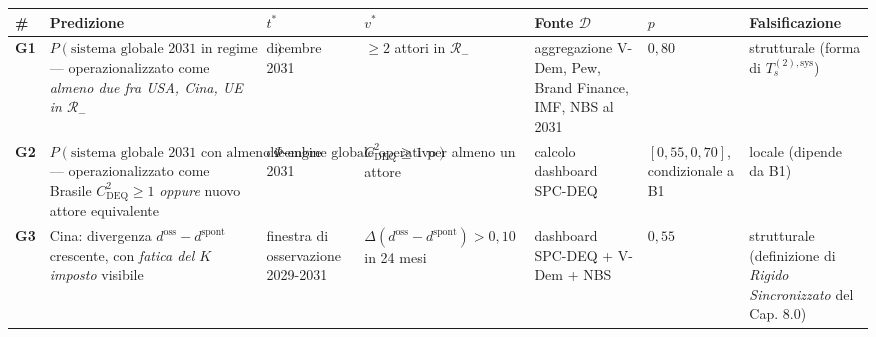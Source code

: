 {\def\LTcaptype{none} %
{\small\begin{longtable}[]{@{}
  >{\raggedright\arraybackslash}p{}
  >{\raggedright\arraybackslash}p{}
  >{\raggedright\arraybackslash}p{}
  >{\raggedright\arraybackslash}p{}
  >{\raggedright\arraybackslash}p{}
  >{\raggedright\arraybackslash}p{}
  >{\raggedright\arraybackslash}p{}@{}}
\toprule\noalign{}
\begin{minipage}[b]{\linewidth}\raggedright
\#
\end{minipage} & \begin{minipage}[b]{\linewidth}\raggedright
Predizione
\end{minipage} & \begin{minipage}[b]{\linewidth}\raggedright
\(t^*\)
\end{minipage} & \begin{minipage}[b]{\linewidth}\raggedright
\(v^*\)
\end{minipage} & \begin{minipage}[b]{\linewidth}\raggedright
Fonte \(\mathcal{D}\)
\end{minipage} & \begin{minipage}[b]{\linewidth}\raggedright
\(p\)
\end{minipage} & \begin{minipage}[b]{\linewidth}\raggedright
Falsificazione
\end{minipage} \\
\midrule\noalign{}
\endhead
\bottomrule\noalign{}
\endlastfoot
\textbf{G1} &
\(P(\text{sistema globale 2031 in regime di decoerenza generalizzata})\)
--- operazionalizzato come \emph{almeno due fra USA, Cina, UE in
\(\mathcal{R}_-\)} & dicembre 2031 & \(\geq 2\) attori in
\(\mathcal{R}_-\) & aggregazione V-Dem, Pew, Brand Finance, IMF, NBS al
2031 & \(0{,}80\) & strutturale (forma di \(T_s^{(2),\text{sys}}\)) \\
\textbf{G2} &
\(P(\text{sistema globale 2031 con almeno un $\Phi$-engine globale operativo})\)
--- operazionalizzato come Brasile \(C_{\text{DEQ}}^2 \geq 1\)
\emph{oppure} nuovo attore equivalente & dicembre 2031 &
\(C_{\text{DEQ}}^2 \geq 1\) per almeno un attore & calcolo dashboard
SPC-DEQ & \([0{,}55, 0{,}70]\), condizionale a B1 & locale (dipende da
B1) \\
\textbf{G3} & Cina: divergenza \(d^{\text{oss}} - d^{\text{spont}}\)
crescente, con \emph{fatica del \(K\) imposto} visibile & finestra di
osservazione 2029-2031 &
\(\Delta(d^{\text{oss}} - d^{\text{spont}}) > 0{,}10\) in 24 mesi &
dashboard SPC-DEQ + V-Dem + NBS & \(0{,}55\) & strutturale (definizione
di \emph{Rigido Sincronizzato} del Cap. 8.0) \\
\end{longtable}}
}

